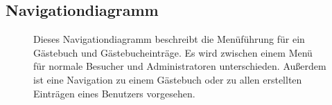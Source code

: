 \documentclass[10pt,a4paper]{scrartcl}
\begin{document}
\subsection{Navigationdiagramm}
\begin{figure}[!htbp]
 \caption{Dieses Navigationdiagramm beschreibt die Menüführung für ein Gästebuch und Gästebucheinträge. Es wird zwischen einem Menü für normale Besucher und Administratoren unterschieden. Außerdem ist eine Navigation zu einem Gästebuch oder zu allen erstellten Einträgen eines Benutzers vorgesehen.}
\end{figure}
\newpage
\end{document}
